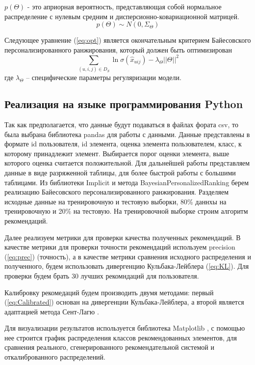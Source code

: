 ${p(\Theta)}$ - это априорная вероятность, представляющая собой нормальное 
распределение с нулевым средним и дисперсионно-ковариационной матрицей.
\begin{equation}
    p(\Theta) \sim N(0, \Sigma_{\Theta})
    \label{eq:apr}
  \end{equation} 

  Следующее уравнение (\ref{eq:opt}) является окончательным критерием Байесовского
  персонализированного ранжирования, который должен быть оптимизирован
  \begin{equation}
    \sum_{(u,i,j)\in D_S} \ln \sigma(\hat x_{uij}) - \lambda_\Theta||\Theta||^2
    \label{eq:opt}
  \end{equation} 
  где $\lambda_\Theta$ -- специфические параметры регуляризации модели.

  \subsection{Реализация на языке программирования Python}
  Так как предполагается, что данные будут подаваться в файлах фората csv,
  то была выбрана библиотека pandas \cite{pandas} для работы с данными.
  Данные представлены в формате id пользователя, id элемента, оценка 
  элемента пользователем, класс, к которому принадлежит элемент.
  Выбирается порог оценки элемента, выше которого оценка считается положительной.
  Для дальнейшей работы представляем данные в виде разряженной таблицы, для более быстрой работы с большими таблицами.
  Из библиотеки Implicit \cite{imp} и метода BayesianPersonalizedRanking
   берем реализацию Байесовского
  персонализированного ранжирования.
  Разделяем исходные данные на тренировочную и тестовую выборки, 80\% даннхы на 
  тренировочную и 20\% на тестовую. На тренировочной выборке строим алгоритм рекомендаций.

  Далее реализуем метрики для проверки качества полученных рекомендаций.
  В качестве метрики для проверки точности рекомендаций используем precision (\ref{eq:prec}) (точность),
  а в качестве метрики сравнения исходного распределения и полученного, будем использовать
  дивергенцию Кульбака-Лейблера (\ref{eq:KL}). Для проверки будем брать
  30 лучших рекомндаций для пользователя.

  Калибровку рекомедаций будем производить двумя методами: первый (\ref{eq:Calibrated})
  основан на дивергенции Кульбака-Лейблера, а второй является 
  адаптацией метода Сент-Лагю \cite{bib5}.

Для визуализации результатов используется библиотека Matplotlib \cite{plot},
с помощью нее строится график распределения классов рекомендованных 
элементов, для сравнения реального, сгенерированного рекомендательной системой 
и откалиброванного распределений.

